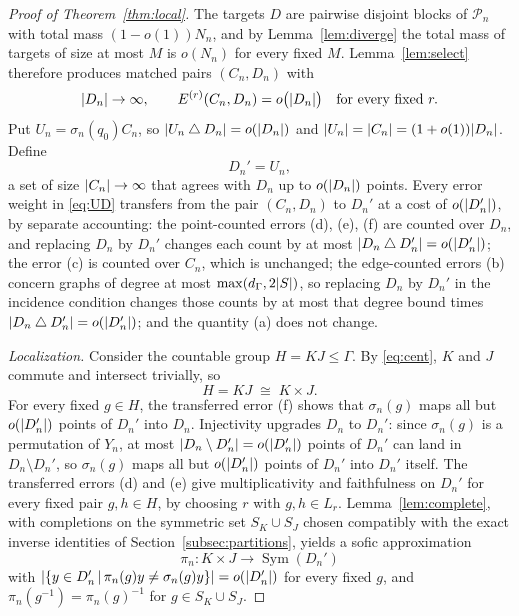 \documentclass[11pt]{amsart}
\theoremstyle{definition}
\theoremstyle{plain}
\newcommand{\Sym}{\operatorname{Sym}}
\newcommand{\cP}{\mathcal P}
\DeclarePairedDelimiter{\abs}{\lvert}{\rvert}
\newcommand{\set}[1]{\left\{#1\right\}}
\newcommand{\suchthat}{\,\middle|\,}
\newcommand{\symdiff}{\mathbin{\triangle}}
\begin{document}
\begin{proof}[Proof of Theorem~\ref{thm:local}]
The targets \(D\) are pairwise disjoint blocks of \(\cP_n\) with total mass \((1-o(1))N_n\), and by Lemma~\ref{lem:diverge} the total mass of targets of size at most \(M\) is \(o(N_n)\) for every fixed \(M\).  Lemma~\ref{lem:select} therefore produces matched pairs \((C_n,D_n)\) with
\begin{equation}\label{eq:UD}
 \abs{D_n}\to\infty,
 \qquad
 E^{(r)}(C_n,D_n)=o\bigl(\abs{D_n}\bigr)
 \quad\text{for every fixed }r.
\end{equation}
Put \(U_n=\sigma_n(q_0)C_n\), so \(\abs{U_n\symdiff D_n}=o(\abs{D_n})\) and \(\abs{U_n}=\abs{C_n}=(1+o(1))\abs{D_n}\).  Define
\begin{equation}\label{eq:Dprime}
 D_n'=U_n,
\end{equation}
a set of size \(\abs{C_n}\to\infty\) that agrees with \(D_n\) up to \(o(\abs{D_n})\) points.  Every error weight in \eqref{eq:UD} transfers from the pair \((C_n,D_n)\) to \(D_n'\) at a cost of \(o(\abs{D_n'})\), by separate accounting: the point-counted errors (d), (e), (f) are counted over \(D_n\), and replacing \(D_n\) by \(D_n'\) changes each count by at most \(\abs{D_n\symdiff D_n'}=o(\abs{D_n'})\); the error (c) is counted over \(C_n\), which is unchanged; the edge-counted errors (b) concern graphs of degree at most \(\max(d_\Gamma,2\abs S)\), so replacing \(D_n\) by \(D_n'\) in the incidence condition changes those counts by at most that degree bound times \(\abs{D_n\symdiff D_n'}=o(\abs{D_n'})\); and the quantity (a) does not change.

\emph{Localization.}  Consider the countable group \(H=KJ\leq\Gamma\).  By \eqref{eq:cent}, \(K\) and \(J\) commute and intersect trivially, so
\[
 H=KJ\;\cong\;K\times J.
\]
For every fixed \(g\in H\), the transferred error (f) shows that \(\sigma_n(g)\) maps all but \(o(\abs{D_n'})\) points of \(D_n'\) into \(D_n\).  Injectivity upgrades \(D_n\) to \(D_n'\): since \(\sigma_n(g)\) is a permutation of \(Y_n\), at most \(\abs{D_n\setminus D_n'}=o(\abs{D_n'})\) points of \(D_n'\) can land in \(D_n\setminus D_n'\), so \(\sigma_n(g)\) maps all but \(o(\abs{D_n'})\) points of \(D_n'\) into \(D_n'\) itself.  The transferred errors (d) and (e) give multiplicativity and faithfulness on \(D_n'\) for every fixed pair \(g,h\in H\), by choosing \(r\) with \(g,h\in L_r\).  Lemma~\ref{lem:complete}, with completions on the symmetric set \(S_K\cup S_J\) chosen compatibly with the exact inverse identities of Section~\ref{subsec:partitions}, yields a sofic approximation
\[
 \pi_n:K\times J\longrightarrow\Sym(D_n')
\]
with \(\abs{\set{y\in D_n'\suchthat\pi_n(g)y\ne\sigma_n(g)y}}=o(\abs{D_n'})\) for every fixed \(g\), and \(\pi_n(g^{-1})=\pi_n(g)^{-1}\) for \(g\in S_K\cup S_J\).


\end{proof}
\end{document}
